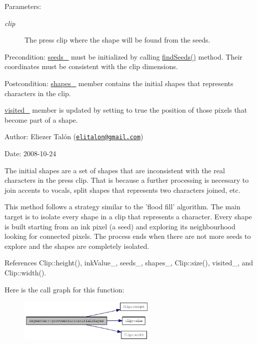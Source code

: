 \begin{Desc}
\item[Parameters:]
\begin{description}
\item[{\em clip}]The press clip where the shape will be found from the seeds.\end{description}
\end{Desc}
\begin{Desc}
\item[Precondition:]\hyperlink{class_segmenter_7859d050250b9fdf7c96374f80008d6e}{seeds\_\-} must be initialized by calling \hyperlink{class_segmenter_bacab187b543a51c5322c01fc0a29ffb}{findSeeds()} method. Their coordinates must be consistent with the clip dimensions.\end{Desc}
\begin{Desc}
\item[Postcondition:]\hyperlink{class_segmenter_41b94ede2829063e0937dc150756e77e}{shapes\_\-} member contains the initial shapes that represents characters in the clip. 

\hyperlink{class_segmenter_fe4dd18749f268aae2b26a1abff6a607}{visited\_\-} member is updated by setting to true the position of those pixels that become part of a shape.\end{Desc}
\begin{Desc}
\item[Author:]Eliezer Talón (\href{mailto:elitalon@gmail.com}{\tt elitalon@gmail.com}) \end{Desc}
\begin{Desc}
\item[Date:]2008-10-24\end{Desc}
The initial shapes are a set of shapes that are inconsistent with the real characters in the press clip. That is because a further processing is necessary to join accents to vocals, split shapes that represents two characters joined, etc.

This method follows a strategy similar to the 'flood fill' algorithm. The main target is to isolate every shape in a clip that represents a character. Every shape is built starting from an ink pixel (a seed) and exploring its neighbourhood looking for connected pixels. The process ends when there are not more seeds to explore and the shapes are completely isolated. 

References Clip::height(), inkValue\_\-, seeds\_\-, shapes\_\-, Clip::size(), visited\_\-, and Clip::width().

Here is the call graph for this function:\nopagebreak
\begin{figure}[H]
\begin{center}
\leavevmode
\includegraphics[width=187pt]{class_segmenter_72c007e345fad7abbf6e9d4edb615a50_cgraph}
\end{center}
\end{figure}


